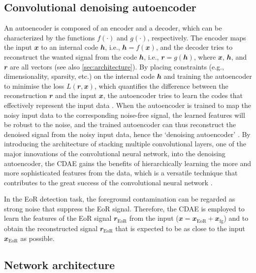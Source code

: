 \documentclass[letters,fleqn,usenatbib,onecolumn]{mnras}
\newcommand{\R}[1]{\mathrm{#1}}
\newcommand{\B}[1]{\mathbfit{#1}}
\begin{document}
\subsection{Convolutional denoising autoencoder}
\label{sec:cdae}

An autoencoder is composed of an encoder and a decoder, which can be
characterized by the functions $f(\cdot)$ and $g(\cdot)$, respectively.
The encoder maps the input $\B{x}$ to an internal code $\B{h}$, i.e.,
$\B{h} = f(\B{x})$, and the decoder tries to reconstruct the wanted
signal from the code $\B{h}$, i.e., $\B{r} = g(\B{h})$, where $\B{x}$,
$\B{h}$, and $\B{r}$ are all vectors (see also \autoref{sec:architecture}).
By placing constraints (e.g., dimensionality, sparsity, etc.\@) on the
internal code $\B{h}$ and training the autoencoder to minimise the
loss $L(\B{r}, \B{x})$, which quantifies the difference between the
reconstruction $\B{r}$ and the input $\B{x}$, the autoencoder tries to
learn the codes that effectively represent the input data
\citep[e.g.,][chapter 14]{goodfellow2016}.
{\color{cyan}%
When the autoencoder is trained to map the noisy input data to the
corresponding noise-free signal, the learned features will be robust to
the noise, and the trained autoencoder can thus reconstruct the denoised
signal from the noisy input data, hence the `denoising autoencoder'
\citep{vincent2008,vincent2010}.
By introducing the architecture of stacking multiple convolutional
layers, one of the major innovations of the convolutional neural network,
into the denoising autoencoder, the CDAE gains the benefits of
hierarchically learning the more and more sophisticated features from
the data, which is a versatile technique that contributes to the great
success of the convolutional neural network \citep{du2017}.} %

In the EoR detection task, the foreground contamination can be regarded
as strong noise that suppress the EoR signal.
Therefore, the CDAE is employed to learn the features of the EoR signal
$\B{r}_{\R{EoR}}$ from the input ($\B{x} = \B{x}_{\R{EoR}} + \B{x}_{\R{fg}}$)
and to obtain the reconstructed signal $\B{r}_{\R{EoR}}$ that is
expected to be as close to the input $\B{x}_{\R{EoR}}$ as possible.


\subsection{Network architecture}
\label{sec:architecture}
\end{document}
